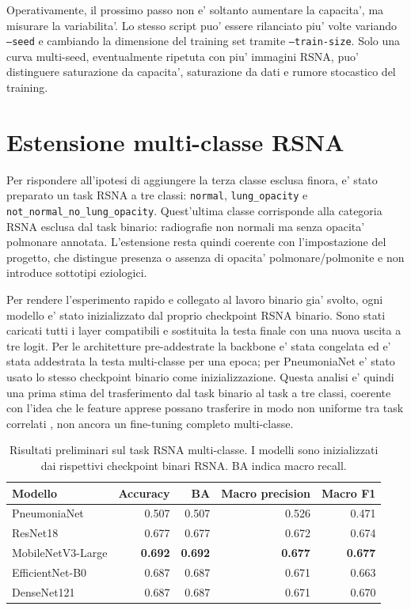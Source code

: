 \documentclass[11pt,a4paper]{article}
\begin{document}
Operativamente, il prossimo passo non e' soltanto aumentare la capacita', ma
misurare la variabilita'. Lo stesso script puo' essere rilanciato piu' volte
variando \texttt{--seed} e cambiando la dimensione del training set tramite
\texttt{--train-size}. Solo una curva multi-seed, eventualmente ripetuta con
piu' immagini RSNA, puo' distinguere saturazione da capacita', saturazione da
dati e rumore stocastico del training.

\section{Estensione multi-classe RSNA}

Per rispondere all'ipotesi di aggiungere la terza classe esclusa finora, e'
stato preparato un task RSNA a tre classi:
\texttt{normal}, \texttt{lung\_opacity} e
\texttt{not\_normal\_no\_lung\_opacity}. Quest'ultima classe corrisponde alla
categoria RSNA esclusa dal task binario: radiografie non normali ma senza
opacita' polmonare annotata. L'estensione resta quindi coerente con
l'impostazione del progetto, che distingue presenza o assenza di opacita'
polmonare/polmonite e non introduce sottotipi eziologici.

Per rendere l'esperimento rapido e collegato al lavoro binario gia' svolto, ogni
modello e' stato inizializzato dal proprio checkpoint RSNA binario. Sono stati
caricati tutti i layer compatibili e sostituita la testa finale con una nuova
uscita a tre logit. Per le architetture pre-addestrate la backbone e' stata
congelata ed e' stata addestrata la testa multi-classe per una epoca; per
PneumoniaNet e' stato usato lo stesso checkpoint binario come inizializzazione.
Questa analisi e' quindi una prima stima del trasferimento dal task binario al
task a tre classi, coerente con l'idea che le feature apprese possano trasferire
in modo non uniforme tra task correlati \cite{yosinski2014transferable}, non
ancora un fine-tuning completo multi-classe.

\begin{table}[H]
\centering
\caption{Risultati preliminari sul task RSNA multi-classe. I modelli sono inizializzati dai rispettivi checkpoint binari RSNA. BA indica macro recall.}
\begin{tabular}{lrrrr}
\toprule
Modello & Accuracy & BA & Macro precision & Macro F1 \\
\midrule
PneumoniaNet & 0.507 & 0.507 & 0.526 & 0.471 \\
ResNet18 & 0.677 & 0.677 & 0.672 & 0.674 \\
MobileNetV3-Large & \textbf{0.692} & \textbf{0.692} & \textbf{0.677} & \textbf{0.677} \\
EfficientNet-B0 & 0.687 & 0.687 & 0.671 & 0.663 \\
DenseNet121 & 0.687 & 0.687 & 0.671 & 0.670 \\
\bottomrule
\end{tabular}
\end{table}
\end{document}

